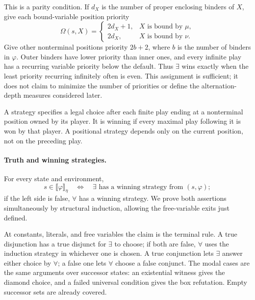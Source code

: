 This is a parity condition. If \(d_X\) is the
number of proper enclosing binders of \(X\),
give each bound-variable position priority
\[
 \Omega(s,X)=
 \begin{cases}
  2d_X+1,&X\text{ is bound by }\mu,\\
  2d_X,&X\text{ is bound by }\nu.
 \end{cases}
\]
Give other nonterminal positions priority
\(2b+2\), where \(b\) is the number of binders
in \(\varphi\). Outer binders have lower
priority than inner ones, and every infinite
play has a recurring variable priority below
the default. Thus \(\exists\) wins exactly
when the least priority recurring infinitely
often is even. This assignment is sufficient;
it does not claim to minimize the number of
priorities or define the alternation-depth
measures considered later.

A strategy specifies a legal choice after
each finite play ending at a nonterminal
position owned by its player. It is winning if every maximal
play following it is won by that player.
A positional strategy depends only on the
current position, not on the preceding play.

\paragraph{Truth and winning strategies.}
\label{sec:p09-mu-game-truth-proof}
For every state and environment,
\[
 s\in\llbracket\varphi\rrbracket_\eta
 \quad\Longleftrightarrow\quad
 \exists\text{ has a winning strategy from }(s,\varphi);
\]
if the left side is false, \(\forall\) has a
winning strategy. We prove both assertions
simultaneously by structural induction, allowing
the free-variable exits just defined.

At constants, literals, and free variables the
claim is the terminal rule. A true disjunction
has a true disjunct for \(\exists\) to choose;
if both are false, \(\forall\) uses the induction
strategy in whichever one is chosen.
A true conjunction lets \(\exists\) answer
either choice by \(\forall\); a false one
lets \(\forall\) choose a false conjunct.
The modal cases are the same arguments over
successor states: an existential witness gives
the diamond choice, and a failed universal
condition gives the box refutation. Empty
successor sets are already covered.

